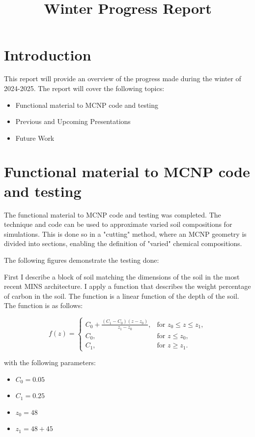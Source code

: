\documentclass{article}
\title{Winter Progress Report}
\date{}
\begin{document}
\maketitle

\section{Introduction}
This report will provide an overview of the progress made during the winter of 2024-2025. The report will cover the following topics:
\begin{itemize}
    \item Functional material to MCNP code and testing
    \item Previous and Upcoming Presentations
    \item Future Work
\end{itemize}

\section{Functional material to MCNP code and testing}
The functional material to MCNP code and testing was completed. The technique and code can be used to approximate varied soil compositions for simulations.
This is done so in a "cutting" method, where an MCNP geometry is divided into sections, enabling the definition of "varied" chemical compositions.

The following figures demonstrate the testing done:

First I describe a block of soil matching the dimensions of the soil in the most recent MINS architecture. 
I apply a function that describes the weight percentage of carbon in the soil. 
The function is a linear function of the depth of the soil. The function is as follows:

\[
f(z) =
\begin{cases} 
    C_0 + \frac{(C_1 - C_0)(z - z_0)}{z_1 - z_0}, & \text{for } z_0 \leq z \leq z_1, \\
    C_0, & \text{for } z \leq z_0, \\
    C_1, & \text{for } z \geq z_1.
\end{cases}
\]

with the following parameters:

\begin{itemize}
    \item $C_0 = 0.05$
    \item $C_1 = 0.25$
    \item $z_0 = 48$
    \item $z_1 = 48+45$
\end{itemize}
\end{document}
